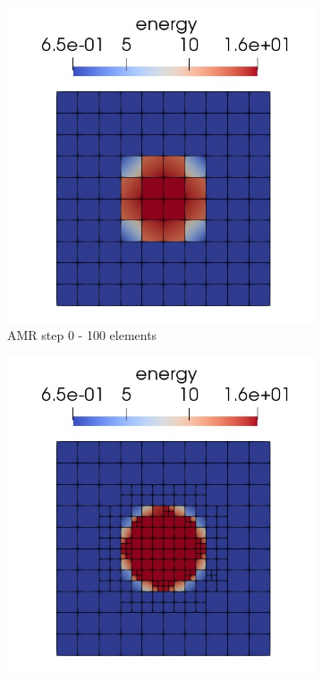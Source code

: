 \begin{figure}[H]
	\begin{subfigure}[H]{40mm}
					\includegraphics[width=\textwidth]{img/adapt/sln0.jpg}
					\caption{AMR step 0 - 100 elements}
	\end{subfigure}
	\hspace{7mm}
	\begin{subfigure}[H]{40mm}
					\includegraphics[width=\textwidth]{img/adapt/sln1.jpg}

\end{subfigure}
\end{figure}
